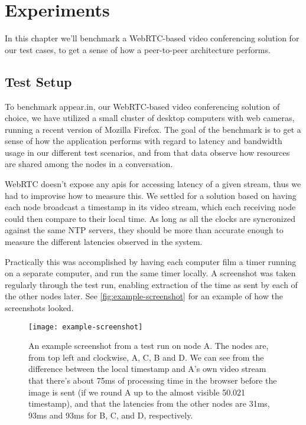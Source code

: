 \chapter{Experiments}\label{chp:experiments}

In this chapter we'll benchmark a WebRTC-based video conferencing solution for our test cases, to get a sense of how a peer-to-peer architecture performs.


\section{Test Setup}

To benchmark appear.in, our WebRTC-based video conferencing solution of choice, we have utilized a small cluster of desktop computers with web cameras, running a recent version of Mozilla Firefox. The goal of the benchmark is to get a sense of how the application performs with regard to latency and bandwidth usage in our different test scenarios, and from that data observe how resources are shared among the nodes in a conversation.

WebRTC doesn't expose any \glspl{api} for accessing latency of a given stream, thus we had to improvise how to measure this. We settled for a solution based on having each node broadcast a timestamp in its video stream, which each receiving node could then compare to their local time. As long as all the clocks are syncronized against the same NTP servers, they should be more than accurate enough to measure the different latencies observed in the system.

Practically this was accomplished by having each computer film a timer running on a separate computer, and run the same timer locally. A screenshot was taken regularly through the test run, enabling extraction of the time as sent by each of the other nodes later. See \autoref{fig:example-screenshot} for an example of how the screenshots looked.

\begin{figure}
    \centering
    \texttt{[image: example-screenshot]}
    \caption{An example screenshot from a test run on node A. The nodes are, from top left and clockwise, A, C, B and D. We can see from the difference between the local timestamp and A's own video stream that there's about 75ms of processing time in the browser before the image is sent (if we round A up to the almost visible 50.021 timestamp), and that the latencies from the other nodes are 31ms, 93ms and 93ms for B, C, and D, respectively.}
    \label{fig:example-screenshot}
\end{figure}

